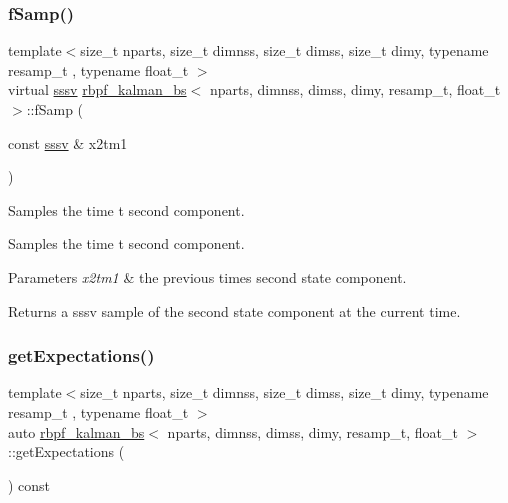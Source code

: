 \subsubsection{\texorpdfstring{f\+Samp()}{fSamp()}}
{\footnotesize\ttfamily template$<$size\+\_\+t nparts, size\+\_\+t dimnss, size\+\_\+t dimss, size\+\_\+t dimy, typename resamp\+\_\+t , typename float\+\_\+t $>$ \\
virtual \hyperlink{classrbpf__kalman__bs_a2b40c9fa0d7a2ca42be3d0c43db0db8b}{sssv} \hyperlink{classrbpf__kalman__bs}{rbpf\+\_\+kalman\+\_\+bs}$<$ nparts, dimnss, dimss, dimy, resamp\+\_\+t, float\+\_\+t $>$\+::f\+Samp (\begin{DoxyParamCaption}\item[{const \hyperlink{classrbpf__kalman__bs_a2b40c9fa0d7a2ca42be3d0c43db0db8b}{sssv} \&}]{x2tm1 }\end{DoxyParamCaption})\hspace{0.3cm}{\ttfamily [pure virtual]}}



Samples the time t second component. 

Samples the time t second component. 
\begin{DoxyParams}{Parameters}
{\em x2tm1} & the previous time\textquotesingle{}s second state component. \\
\hline
\end{DoxyParams}
\begin{DoxyReturn}{Returns}
a sssv sample of the second state component at the current time. 
\end{DoxyReturn}
\mbox{\label{classrbpf__kalman__bs_af4874bee4d5ea66fda9c4212b6030af7}} 
\subsubsection{\texorpdfstring{get\+Expectations()}{getExpectations()}}
{\footnotesize\ttfamily template$<$size\+\_\+t nparts, size\+\_\+t dimnss, size\+\_\+t dimss, size\+\_\+t dimy, typename resamp\+\_\+t , typename float\+\_\+t $>$ \\
auto \hyperlink{classrbpf__kalman__bs}{rbpf\+\_\+kalman\+\_\+bs}$<$ nparts, dimnss, dimss, dimy, resamp\+\_\+t, float\+\_\+t $>$\+::get\+Expectations (\begin{DoxyParamCaption}{ }\end{DoxyParamCaption}) const}



